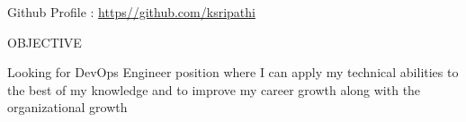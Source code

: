 \documentclass{resume} %
\newcommand{\blank}[1]{\hspace*{#1}}
\begin{document}
\blank{5 cm}
{Github Profile : }
\url{https//github.com/ksripathi}

\begin{rSection}{OBJECTIVE}
  
  { Looking for DevOps Engineer position where I can apply
    my technical abilities to the best of my knowledge and
    to improve my career growth along with the
    organizational growth }


\end{rSection}

\end{document}
